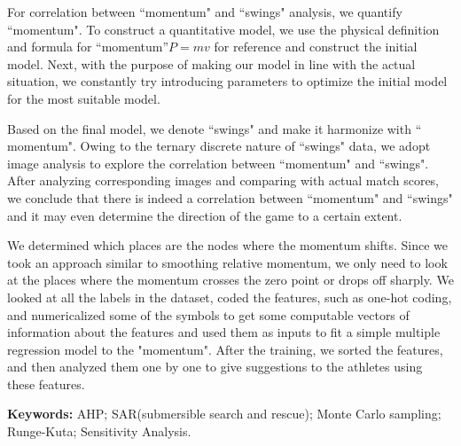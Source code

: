 For correlation between ``momentum" and ``swings" analysis, we quantify ``momentum". To construct a quantitative model, we use the physical definition and formula for ``momentum''$P=mv$ for reference and construct the initial model. Next, with the purpose of  making our model in line with the actual situation, we constantly try introducing parameters to optimize the initial model for the most suitable model.

Based on the final model, we denote ``swings" and make it harmonize with `` momentum".  Owing to the ternary discrete nature of ``swings"  data, we adopt  image analysis to explore the correlation between ``momentum" and ``swings".  After analyzing corresponding images and comparing with actual match scores, we conclude that there is indeed a correlation between ``momentum" and ``swings" and it may even determine the direction of the game to a certain extent.

We determined which places are the nodes where the momentum shifts. Since we took an approach similar to smoothing relative momentum, we only need to look at the places where the momentum crosses the zero point or drops off sharply. We looked at all the labels in the dataset, coded the features, such as one-hot coding, and numericalized some of the symbols to get some computable vectors of information about the features and used them as inputs to fit a simple multiple regression model to the "momentum". After the training, we sorted the features, and then analyzed them one by one to give suggestions to the athletes using these features.



\textbf{Keywords:}  AHP; SAR(submersible search and rescue); Monte Carlo sampling; Runge-Kuta; Sensitivity Analysis.


